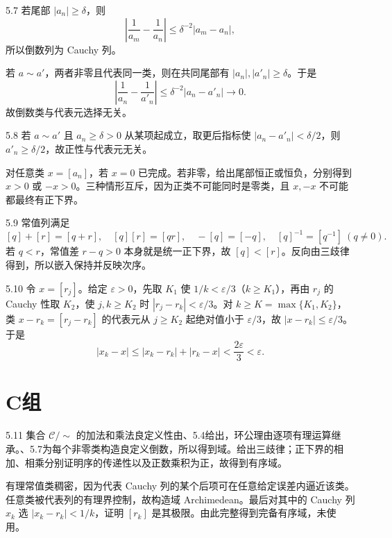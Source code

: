 \begin{solution}{5.7}
若尾部 \(|a_n|\ge\delta\)，则
\[
 \left|\frac1{a_m}-\frac1{a_n}\right|
 \le\delta^{-2}|a_m-a_n|,
\]
所以倒数列为 Cauchy 列。

若 \(a\sim a'\)，两者非零且代表同一类，则在共同尾部有 \(|a_n|,|a'_n|\ge\delta\)。于是
\[
 \left|\frac1{a_n}-\frac1{a'_n}\right|
 \le\delta^{-2}|a_n-a'_n|\longrightarrow0.
\]
故倒数类与代表元选择无关。
\end{solution}

\begin{solution}{5.8}
若 \(a\sim a'\) 且 \(a_n\ge\delta>0\) 从某项起成立，取更后指标使 \(|a_n-a'_n|<\delta/2\)，则 \(a'_n\ge\delta/2\)，故正性与代表元无关。

对任意类 \(x=[a_n]\)，若 \(x=0\) 已完成。若非零，给出尾部恒正或恒负，分别得到 \(x>0\) 或 \(-x>0\)。三种情形互斥，因为正类不可能同时是零类，且 \(x,-x\) 不可能都最终有正下界。
\end{solution}

\begin{solution}{5.9}
常值列满足
\[
 [q]+[r]=[q+r],\quad [q][r]=[qr],\quad
 -[q]=[-q],\quad [q]^{-1}=[q^{-1}]\ (q\ne0).
\]
若 \(q<r\)，常值差 \(r-q>0\) 本身就是统一正下界，故 \([q]<[r]\)。反向由三歧律得到，所以嵌入保持并反映次序。
\end{solution}

\begin{solution}{5.10}
令 \(x=[r_j]\)。给定 \(\varepsilon>0\)，先取 \(K_1\) 使 \(1/k<\varepsilon/3\)（\(k\ge K_1\)），再由 \(r_j\) 的 Cauchy 性取 \(K_2\)，使 \(j,k\ge K_2\) 时 \(|r_j-r_k|<\varepsilon/3\)。对 \(k\ge K=\max\{K_1,K_2\}\)，类 \(x-r_k=[r_j-r_k]\) 的代表元从 \(j\ge K_2\) 起绝对值小于 \(\varepsilon/3\)，故 \(|x-r_k|\le\varepsilon/3\)。于是
\[
 |x_k-x|\le|x_k-r_k|+|r_k-x|<\frac{2\varepsilon}{3}<\varepsilon.
\]
\end{solution}

\section*{C组}

\begin{solution}{5.11}
集合 \(\mathcal C/\sim\) 的加法和乘法良定义性由、5.4给出，环公理由逐项有理运算继承。、5.7为每个非零类构造良定义倒数，所以得到域。给出三歧律；正下界的相加、相乘分别证明序的传递性以及正数乘积为正，故得到有序域。

有理常值类稠密，因为代表 Cauchy 列的某个后项可在任意给定误差内逼近该类。任意类被代表列的有理界控制，故构造域 Archimedean。最后对其中的 Cauchy 列 \(x_k\) 选 \(|x_k-r_k|<1/k\)，证明 \([r_k]\) 是其极限。由此完整得到完备有序域，未使用。
\end{solution}

